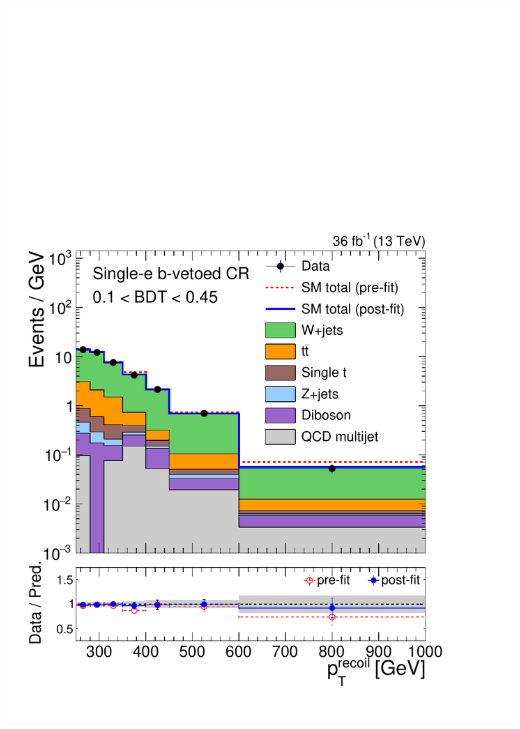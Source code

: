 \documentclass[aspectratio=169,xcolor=dvipsnames,,table,compress]{beamer}
\begin{document}
\begin{frame}[t]
\begin{columns}[T]
\begin{column}{0.125\textwidth}
      \includegraphics[width=\textwidth]{../figures/monotop/postfit/stackedPostfit_singleelectronw_monotop_loose.pdf}\\

\end{column}
\end{columns}
\end{frame}
\end{document}

